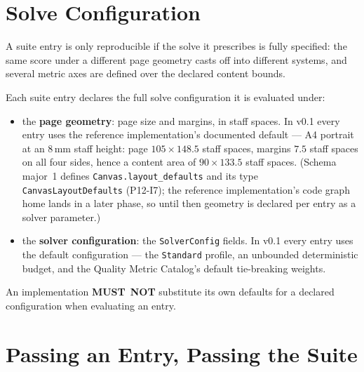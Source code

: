 \documentclass[11pt,letterpaper]{report}
\newcounter{requirement}[chapter]
\newcommand{\MUSTNOT}{\textbf{MUST}\nobreak\ \textbf{NOT}}
\begin{document}
\section{Solve Configuration}
\label{sec:model:solve-config}

A suite entry is only reproducible if the solve it prescribes is fully
specified: the same score under a different page geometry casts off into
different systems, and several metric axes are defined over the declared
content bounds.

\begin{requirement}
\label{req:refsuite:solve-config}
Each suite entry declares the full solve configuration it is evaluated
under:

\begin{itemize}
  \item the \textbf{page geometry}: page size and margins, in staff
    spaces. In v0.1 every entry uses the reference implementation's
    documented default --- A4 portrait at an 8\,mm staff height: page
    $105 \times 148.5$ staff spaces, margins $7.5$ staff spaces on all
    four sides, hence a content area of $90 \times 133.5$ staff spaces.
    (Schema major~1 defines \texttt{Canvas.layout\_defaults} and its type
    \texttt{CanvasLayoutDefaults} (P12-I7); the reference implementation's
    code graph home lands in a later phase, so until then geometry is
    declared per entry as a solver parameter.)
  \item the \textbf{solver configuration}: the \texttt{SolverConfig}
    fields. In v0.1 every entry uses the default configuration --- the
    \texttt{Standard} profile, an unbounded deterministic budget, and
    the Quality Metric Catalog's default tie-breaking weights.
\end{itemize}

An implementation \MUSTNOT{} substitute its own defaults for a declared
configuration when evaluating an entry.
\end{requirement}

\section{Passing an Entry, Passing the Suite}
\label{sec:model:pass}
\end{document}
